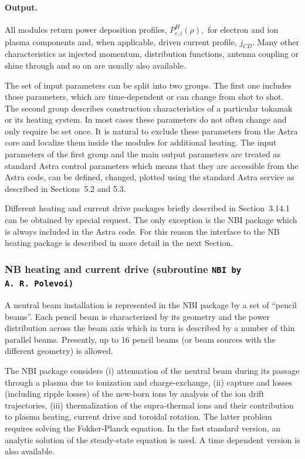 \paragraph{Output.} All modules return power deposition profiles,
$P_{e,i}^H(\rho),$ for electron and ion plasma components and, 
when applicable, driven current profile, $j_{CD}.$ 
Many other characteristics as injected momentum, distribution functions,
antenna coupling or shine through and so on are usually also available.

The set of input parameters can be split into two groups.
The first one includes those parameters, which are 
time-dependent or can change from shot to shot. 
The second group describes construction characteristics of a particular
tokamak or its heating system.
In most cases these parameters do not often change and only require be
set once. 
It is natural to exclude these parameters from the Astra core and
localize them inside the modules for additional heating.
The input parameters of the first group and the main output parameters
are treated as standard Astra control parameters which means that they
are accessible from the Astra code, can be defined, changed, plotted
using the standard Astra service as described in Sections~5.2 and 5.3.  

Different heating and current drive packages briefly described in
Section~3.14.1 can be obtained by special request.
The only exception is the NBI package which is always included in the
Astra code. 
For this reason the interface to the NB heating package is described in
more detail in the next Section.

\subsubsection{NB heating and current drive {\rm (subroutine \tt NBI \rm
by A.~R.~Polevoi)}} 

A neutral beam installation is represented in the NBI package by a set
of ``pencil beams''.  
Each pencil beam is characterized by its geometry and the power
distribution across the beam axis which in turn is described by a
number of thin parallel beams.
Presently, up to 16 pencil beams (or beam sources with the different
geometry) is allowed.

The NBI package considers (i) attenuation of the neutral beam during its
passage through a plasma due to ionization and charge-exchange, 
(ii) capture and losses (including ripple losses) of the new-born ions 
by analysis of the ion drift trajectories, 
(iii) thermalization of the supra-thermal ions and their
contribution to plasma heating, current drive and toroidal rotation. 
The latter problem requires solving the Fokker-Planck equation. 
In the fast standard version, an analytic solution of the steady-state
equation is used. A time dependent version is also available.

